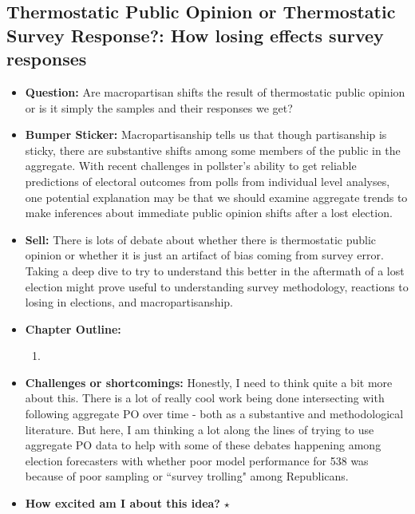 \documentclass[12pt]{article}
\begin{document}
\subsection{Thermostatic Public Opinion or Thermostatic Survey Response?: How losing effects survey responses}
    \begin{itemize}
        \item \textbf{Question:} Are macropartisan shifts the result of thermostatic public opinion or is it simply the samples and their responses we get?
        \item \textbf{Bumper Sticker:} Macropartisanship tells us that though partisanship is sticky, there are substantive shifts among some members of the public in the aggregate. With recent challenges in pollster's ability to get reliable predictions of electoral outcomes from polls from individual level analyses, one potential explanation may be that we should examine aggregate trends to make inferences about immediate public opinion shifts after a lost election.
        \item \textbf{Sell:} There is lots of debate about whether there is thermostatic public opinion or whether it is just an artifact of bias coming from survey error. Taking a deep dive to try to understand this better in the aftermath of a lost election might prove useful to understanding survey methodology, reactions to losing in elections, and macropartisanship.
        \item \textbf{Chapter Outline:}
        \begin{enumerate}
            \item
        \end{enumerate}
        \item \textbf{Challenges or shortcomings:} Honestly, I need to think quite a bit more about this. There is a lot of really cool work being done intersecting with following aggregate PO over time - both as a substantive and methodological literature. But here, I am thinking a lot along the lines of trying to use aggregate PO data to help with some of these debates happening among election forecasters with whether poor model performance for 538 was because of poor sampling or ``survey trolling" among Republicans.
        \item \textbf{How excited am I about this idea?} $\star$
    \end{itemize}
\end{document}
